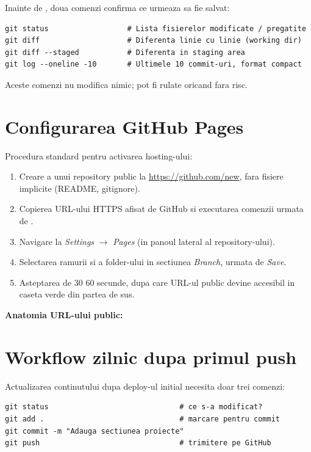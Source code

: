 Inainte de , doua comenzi confirma ce urmeaza sa fie salvat:

\begin{lstlisting}[style=bash, caption={Verificare inainte de commit}]
git status                  # Lista fisierelor modificate / pregatite
git diff                    # Diferenta linie cu linie (working dir)
git diff --staged           # Diferenta in staging area
git log --oneline -10       # Ultimele 10 commit-uri, format compact
\end{lstlisting}

Aceste comenzi nu modifica nimic; pot fi rulate oricand fara risc.

\section{Configurarea GitHub Pages}

Procedura standard pentru activarea hosting-ului:

\begin{enumerate}
  \item Creare a unui repository public la \url{https://github.com/new}, fara fisiere implicite (README, gitignore).
  \item Copierea URL-ului HTTPS afisat de GitHub si executarea comenzii  urmata de .
  \item Navigare la \emph{Settings} $\to$ \emph{Pages} (in panoul lateral al repository-ului).
  \item Selectarea ramurii  si a folder-ului  in sectiunea \emph{Branch}, urmata de \emph{Save}.
  \item Asteptarea de 30 \textendash{} 60 secunde, dupa care URL-ul public devine accesibil in caseta verde din partea de sus.
\end{enumerate}

\textbf{Anatomia URL-ului public:} 

\section{Workflow zilnic dupa primul push}

Actualizarea continutului dupa deploy-ul initial necesita doar trei comenzi:

\begin{lstlisting}[style=bash]
git status                              # ce s-a modificat?
git add .                               # marcare pentru commit
git commit -m "Adauga sectiunea proiecte"
git push                                # trimitere pe GitHub
\end{lstlisting}

